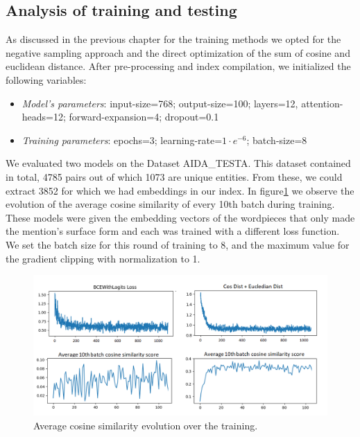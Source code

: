 \subsection{Analysis of training and testing}
As discussed in the previous chapter for the training methods we opted for the negative sampling approach and the direct optimization of the sum of cosine and euclidean distance. After pre-processing and index compilation, we initialized the following variables:
\begin{itemize}
\item{\textit{Model's parameters}: input-size=768; output-size=100; layers=12, attention-heads=12; forward-expansion=4; dropout=0.1}
\item{\textit{Training parameters}: epochs=3; learning-rate=$1\cdot e^{-6}$; batch-size=8}

\end{itemize}

We evaluated two models on the Dataset AIDA\_TESTA. This dataset contained in total, 4785 pairs out of which 1073 are unique entities. From these, we could extract 3852 for which we had embeddings in our index.\newline
In figure\ref{training1st} we observe the evolution of the average cosine similarity of every 10th batch during training. These models were given the embedding vectors of the wordpieces that only made the mention's surface form and each was trained with a different loss function. We set the batch size for this round of training to 8, and the maximum value for the gradient clipping with normalization to 1.\newline

\begin{figure}[h]
\centering
\includegraphics[width=15cm]{figures/NoContextEpoch0.png}
\caption{Average cosine similarity evolution over the training.}
\label{training1st}
\end{figure}

